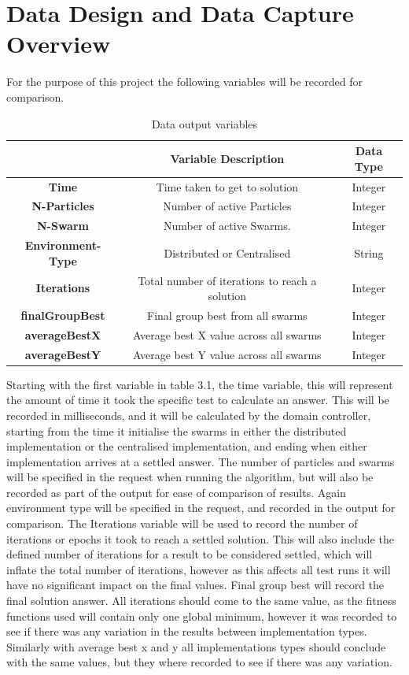 \documentclass[oneside,12pt]{book}
\begin{document}
\section{Data Design and Data Capture Overview}
For the purpose of this project the following variables will be recorded for comparison. 
\begin{table}[H]
  \centering
    \begin{tabular}{| c | c | c |}
    \hline
     & \textbf{Variable Description} & \textbf{Data Type} \\ \hline
    \textbf{Time} & Time taken to get to solution & Integer \\ \hline
    \textbf{N-Particles} & Number of active Particles  & Integer \\ \hline
    \textbf{N-Swarm} & Number of active Swarms. & Integer \\ \hline
    \textbf{Environment-Type} & Distributed or Centralised & String \\ \hline
    \textbf{Iterations} & Total number of iterations to reach a solution & Integer \\ \hline
    \textbf{finalGroupBest} & Final group best from all swarms & Integer \\ \hline
    \textbf{averageBestX} & Average best X value across all swarms  & Integer \\ \hline
    \textbf{averageBestY} & Average best Y value across all swarms & Integer \\ \hline
    \end{tabular}
  \caption{Data output variables}
  \label{tab:data_output_design}
\end{table}
Starting with the first variable in table 3.1, the time variable, this will represent the amount of time it took the specific test to calculate an answer. This will be recorded in milliseconds, and it will be calculated by the domain controller, starting from the time it initialise the swarms in either the distributed implementation or the centralised implementation, and ending when either implementation arrives at a settled answer. The number of particles and swarms will be specified in the request when running the algorithm, but will also be recorded as part of the output for ease of comparison of results. Again environment type will be specified in the request, and recorded in the output for comparison. The Iterations variable will be used to record the number of iterations or epochs it took to reach a settled solution. This will also include the defined number of iterations for a result to be considered settled, which will inflate the total number of iterations, however as this affects all test runs it will have no significant impact on the final values. Final group best will record the final solution answer. All iterations should come to the same value, as the fitness functions used will contain only one global minimum, however it was recorded to see if there was any variation in the results between implementation types. Similarly with average best x and y all implementations types should conclude with the same values, but they where recorded to see if there was any variation.
\end{document}
